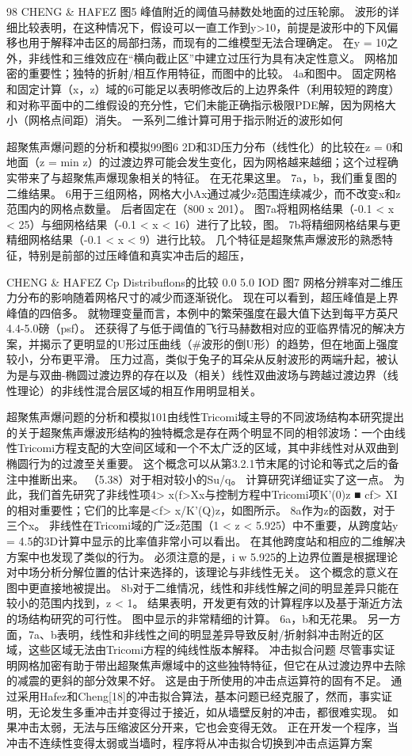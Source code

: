 \documentclass[UTF8,11pt,a4paper,openany,fontset=fandol]{ctexbook}
\begin{document}
98 CHENG \& HAFEZ 图5 峰值附近的阈值马赫数处地面的过压轮廓。 波形的详细比较表明，在这种情况下，假设可以一直工作到y>10，前提是波形中的下风偏移也用于解释冲击区的局部扫荡，而现有的二维模型无法合理确定。 在y = 10之外，非线性和三维效应在“横向截止区”中建立过压行为具有决定性意义。 网格加密的重要性；独特的折射/相互作用特征，而图中的比较。 4a和图中。 固定网格和固定计算（x，z）域的6可能足以表明修改后的上边界条件（利用较短的跨度）和对称平面中的二维假设的充分性，它们未能正确指示极限PDE解，因为网格大小（网格点间距）消失。 一系列二维计算可用于指示附近的波形如何

超聚焦声爆问题的分析和模拟99图6 2D和3D压力分布（线性化）的比较在z = 0和地面（z = min z）的过渡边界可能会发生变化，因为网格越来越细；这个过程确实带来了与超聚焦声爆现象相关的特征。 在无花果这里。 7a，b，我们重复图的二维结果。 6用于三组网格，网格大小Ax通过减少z范围连续减少，而不改变x和z范围内的网格点数量。 后者固定在（800 x 201）。 图7a将粗网格结果（-0.1 < x < 25）与细网格结果（-0.1 < x < 16）进行了比较，图。 7b将精细网格结果与更精细网格结果（-0.1 < x < 9）进行比较。 几个特征是超聚焦声爆波形的熟悉特征，特别是前部的过压峰值和真实冲击后的超压，

CHENG \& HAFEZ Cp Distribuflons的比较 0.0 5.0 IOD 图7 网格分辨率对二维压力分布的影响随着网格尺寸的减少而逐渐锐化。 现在可以看到，超压峰值是上界峰值的四倍多。 就物理变量而言，本例中的繁荣强度在最大值下达到每平方英尺4.4-5.0磅（psf）。 还获得了与低于阈值的飞行马赫数相对应的亚临界情况的解决方案，并揭示了更明显的U形过压曲线（\#波形的倒U形）的趋势，但在地面上强度较小，分布更平滑。 压力过高，类似于兔子的耳朵从反射波形的两端升起，被认为是与双曲-椭圆过渡边界的存在以及（相关）线性双曲波场与跨越过渡边界（线性理论）的非线性混合层区域的相互作用明显相关。

超聚焦声爆问题的分析和模拟101由线性Tricomi域主导的不同波场结构本研究提出的关于超聚焦声爆波形结构的独特概念是存在两个明显不同的相邻波场：一个由线性Tricomi方程支配的大空间区域和一个不太广泛的区域，其中非线性对从双曲到椭圆行为的过渡至关重要。 这个概念可以从第3.2.1节末尾的讨论和等式之后的备注中推断出来。 （5.38）对于相对较小的Su/q。 计算研究详细证实了这一点。 为此，我们首先研究了非线性项4> x(f>Xx与控制方程中Tricomi项K'(0)z ■ cf> XI的相对重要性；它们的比率是<f> x/K'(Q)z，如图所示。 8a作为z的函数，对于三个x。 非线性在Tricomi域的广泛z范围（1 < z < 5.925）中不重要，从跨度站y = 4.5的3D计算中显示的比率值非常小可以看出。 在其他跨度站和相应的二维解决方案中也发现了类似的行为。 必须注意的是，i w 5.925的上边界位置是根据理论对中场分析分解位置的估计来选择的，该理论与非线性无关。 这个概念的意义在图中更直接地被提出。 8b对于二维情况，线性和非线性解之间的明显差异只能在较小的范围内找到，z < 1。 结果表明，开发更有效的计算程序以及基于渐近方法的场结构研究的可行性。 图中显示的非常精细的计算。 6a，b和无花果。 另一方面，7a、b表明，线性和非线性之间的明显差异导致反射/折射斜冲击附近的区域，这些区域无法由Tricomi方程的纯线性版本解释。 冲击拟合问题 尽管事实证明网格加密有助于带出超聚焦声爆域中的这些独特特征，但它在从过渡边界中去除的减震的更斜的部分效果不好。 这是由于所使用的冲击点运算符的固有不足。 通过采用Hafez和Cheng[18]的冲击拟合算法，基本问题已经克服了，然而，事实证明，无论发生多重冲击并变得过于接近，如从墙壁反射的冲击，都很难实现。 如果冲击太弱，无法与压缩波区分开来，它也会变得无效。 正在开发一个程序，当冲击不连续性变得太弱或当墙时，程序将从冲击拟合切换到冲击点运算方案
\end{document}
